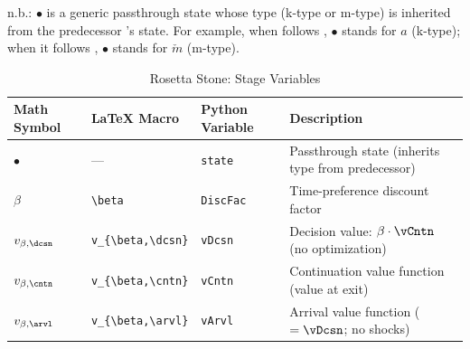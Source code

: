 \documentclass[titlepage, headings=optiontotocandhead]{econark}
\begin{document}
\begin{table}[h]\caption{Discounting {\Stg} ($\beta$) {\Prchs}}\label{tab:prchs-disc}
\newsavebox{\disctablebox}%
\begin{center}
    \usebox{\disctablebox}

    \parbox{\wd\disctablebox}{\footnotesize n.b.: $\bullet$ is a generic passthrough state whose type (k-type or m-type) is inherited from the predecessor {\stg}'s {\Continuation} state.  For example, when  follows , $\bullet$ stands for $a$ (k-type); when it follows , $\bullet$ stands for $\check{m}$ (m-type).}
  \end{center}
  \end{table}

\begin{table}[h]
\caption{Rosetta Stone:  Stage Variables}
\label{tab:rosetta-disc}
\begin{center}
\begin{tabular}{l|l|l|l}
Math Symbol & \LaTeX{} Macro & Python Variable & Description \\
\hline
$\bullet$                    & ---                          & \texttt{state}       & Passthrough state (inherits type from predecessor) \\
$\beta$                   & \verb|\beta|              & \texttt{DiscFac}     & Time-preference discount factor \\
$v_{\beta,\dcsn}$    & \verb|v_{\beta,\dcsn}| & \texttt{vDcsn}    & Decision value: $\beta \cdot \vCntn$ (no optimization) \\
$v_{\beta,\cntn}$    & \verb|v_{\beta,\cntn}| & \texttt{vCntn}    & Continuation value function (value at exit) \\
$v_{\beta,\arvl}$    & \verb|v_{\beta,\arvl}| & \texttt{vArvl}    & Arrival value function ($= \vDcsn$; no shocks) \\
\hline
\end{tabular}
\end{center}
\end{table}
\end{document}
